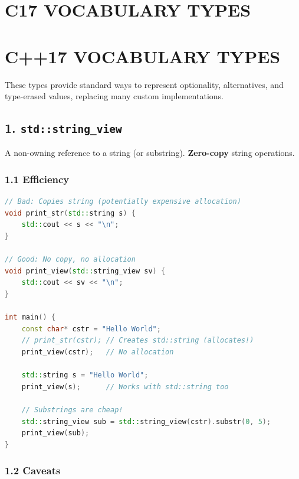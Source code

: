 \hypertarget{c17-vocabulary-types}{%
\chapter{C17 VOCABULARY TYPES}\label{c17-vocabulary-types}}

\hypertarget{c17-vocabulary-types-1}{%
\chapter{C++17 VOCABULARY TYPES}\label{c17-vocabulary-types-1}}

These types provide standard ways to represent optionality,
alternatives, and type-erased values, replacing many custom
implementations.

\hypertarget{stdstring_view}{%
\section{\texorpdfstring{1.
\texttt{std::string\_view}}{1. std::string\_view}}\label{stdstring_view}}

A non-owning reference to a string (or substring). \textbf{Zero-copy}
string operations.

\hypertarget{efficiency}{%
\subsection{1.1 Efficiency}\label{efficiency}}

\begin{lstlisting}[language={C++}]
// Bad: Copies string (potentially expensive allocation)
void print_str(std::string s) {
    std::cout << s << "\n";
}

// Good: No copy, no allocation
void print_view(std::string_view sv) {
    std::cout << sv << "\n";
}

int main() {
    const char* cstr = "Hello World";
    // print_str(cstr); // Creates std::string (allocates!)
    print_view(cstr);   // No allocation
    
    std::string s = "Hello World";
    print_view(s);      // Works with std::string too
    
    // Substrings are cheap!
    std::string_view sub = std::string_view(cstr).substr(0, 5); 
    print_view(sub);
}
\end{lstlisting}

\hypertarget{caveats}{%
\subsection{1.2 Caveats}\label{caveats}}

